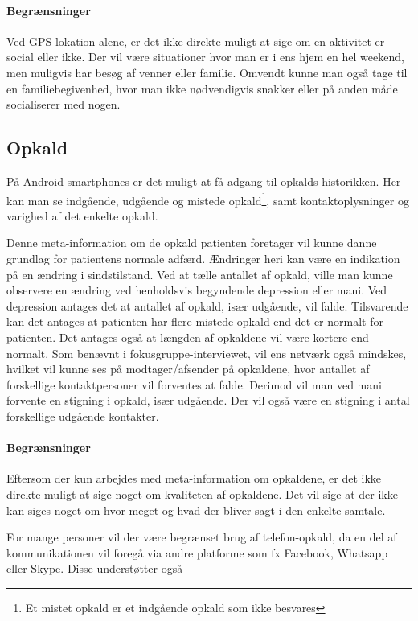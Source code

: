 \paragraph{Begrænsninger}
Ved GPS-lokation alene, er det ikke direkte muligt at sige om en aktivitet er social eller ikke.
Der vil være situationer hvor man er i ens hjem en hel weekend, men muligvis har besøg af venner eller familie.
Omvendt kunne man også tage til en familiebegivenhed, hvor man ikke nødvendigvis snakker eller på anden måde socialiserer med nogen.

\subsection{Opkald}
På Android-smartphones er det muligt at få adgang til opkalds-historikken.
Her kan man se indgående, udgående og mistede opkald\footnote{Et mistet opkald er et indgående opkald som ikke besvares}, samt kontaktoplysninger og varighed af det enkelte opkald.

Denne meta-information om de opkald patienten foretager vil kunne danne grundlag for patientens normale adfærd.
Ændringer heri kan være en indikation på en ændring i sindstilstand.
Ved at tælle antallet af opkald, ville man kunne observere en ændring ved henholdsvis begyndende depression eller mani.
Ved depression antages det at antallet af opkald, især udgående, vil falde.
Tilsvarende kan det antages at patienten har flere mistede opkald end det er normalt for patienten.
Det antages også at længden af opkaldene vil være kortere end normalt.
Som benævnt i fokusgruppe-interviewet, vil ens netværk også mindskes, hvilket vil kunne ses på modtager/afsender på opkaldene, hvor antallet af forskellige kontaktpersoner vil forventes at falde.
Derimod vil man ved mani forvente en stigning i opkald, især udgående.
Der vil også være en stigning i antal forskellige udgående kontakter.

\paragraph{Begrænsninger}
Eftersom der kun arbejdes med meta-information om opkaldene, er det ikke direkte muligt at sige noget om kvaliteten af opkaldene.
Det vil sige at der ikke kan siges noget om hvor meget og hvad der bliver sagt i den enkelte samtale.

For mange personer  vil der være begrænset brug af telefon-opkald, da en del af kommunikationen vil foregå via andre platforme som fx Facebook, Whatsapp eller Skype.
Disse understøtter også

